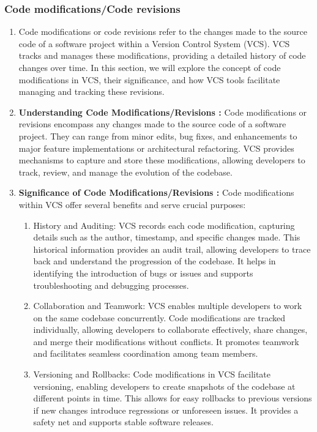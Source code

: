 \subsubsection*{Code modifications/Code revisions}
\begin{enumerate}
    \item Code modifications or code revisions refer to the changes made to the source code of a software project within a Version Control System (VCS). VCS tracks and manages these modifications, providing a detailed history of code changes over time. In this section, we will explore the concept of code modifications in VCS, their significance, and how VCS tools facilitate managing and tracking these revisions.
    \item \textbf{Understanding Code Modifications/Revisions : }Code modifications or revisions encompass any changes made to the source code of a software project. They can range from minor edits, bug fixes, and enhancements to major feature implementations or architectural refactoring. VCS provides mechanisms to capture and store these modifications, allowing developers to track, review, and manage the evolution of the codebase.
    \item \textbf{Significance of Code Modifications/Revisions : }Code modifications within VCS offer several benefits and serve crucial purposes:
    \begin{enumerate}
        \item History and Auditing: VCS records each code modification, capturing details such as the author, timestamp, and specific changes made. This historical information provides an audit trail, allowing developers to trace back and understand the progression of the codebase. It helps in identifying the introduction of bugs or issues and supports troubleshooting and debugging processes.
        \item Collaboration and Teamwork: VCS enables multiple developers to work on the same codebase concurrently. Code modifications are tracked individually, allowing developers to collaborate effectively, share changes, and merge their modifications without conflicts. It promotes teamwork and facilitates seamless coordination among team members.
        \item Versioning and Rollbacks: Code modifications in VCS facilitate versioning, enabling developers to create snapshots of the codebase at different points in time. This allows for easy rollbacks to previous versions if new changes introduce regressions or unforeseen issues. It provides a safety net and supports stable software releases.

\end{enumerate}
\end{enumerate}
